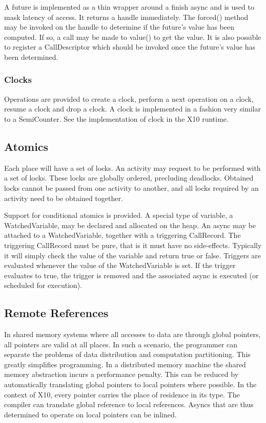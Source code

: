 \documentclass{article}
\begin{document}
A future is implemented as a thin wrapper around a finish async and is
used to mask latency of access.  It returns a handle immediately. 
The forced() method may be invoked on the handle to determine if the
future's value has been computed. If so, a call may be made to value()
to get the value. It is also possible to register a CallDescriptor which
should be invoked once the future's value has been determined.

\subsubsection{Clocks}

Operations are provided to create a clock, perform a next operation on
a clock, resume a clock and drop a clock. A clock is implemented in a
fashion very similar to a SemiCounter. See the implementation of clock
in the X10 runtime.

\subsection{Atomics}

Each place will have a set of locks. An activity may request to be
performed with a set of locks. These locks are globally ordered,
precluding deadlocks. Obtained locks cannot be passed from one
activity to another, and all locks required by an activity need to be
obtained together. 

Support for conditional atomics is provided. A special type of
variable, a WatchedVariable, may be declared and allocated on the
heap. An async may be attached to a WatchedVariable, together with
a triggering CallRecord. The triggering CallRecord must be pure, that
is it must have no side-effects. Typically it will simply check the
value of the variable and return true or false. Triggers are evaluated
whenever the value of the WatchedVariable is set. If the trigger
evaluates to true, the trigger is removed and the associated
async is executed (or scheduled for execution). 

\subsection{Remote References}

In shared memory systems where all accesses to data are through global
pointers, all pointers are valid at all places. In such a scenario,
the programmer can separate the problems of data distribution and
computation partitioning. This greatly simplifies programming. In a
distributed memory machine the shared memory abstraction incurs a
performance penalty. This can be reduced by automatically translating
global pointers to local pointers where possible.  In the context of
X10, every pointer carries the place of residence in its type. The
compiler can translate global reference to local references. Asyncs
that are thus determined to operate on local pointers can be inlined.
\end{document}
